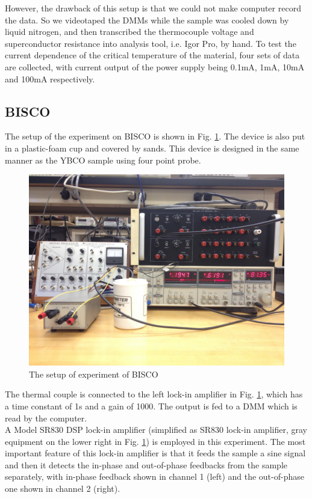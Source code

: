 \documentclass[prb,preprint]{revtex4-1}
\begin{document}
However, the drawback of this setup is that we could not make computer record the data. So we videotaped the DMMs while the sample was cooled down by liquid nitrogen, and then transcribed the thermocouple voltage and superconductor resistance into analysis tool, i.e. Igor Pro, by hand. To test the current dependence of the critical temperature of the material, four sets of data are collected, with current output of the power supply being 0.1mA, 1mA, 10mA and 100mA respectively.\\

\subsection{BISCO}

The setup of the experiment on BISCO is shown in Fig. \ref{biscosetup}. The device is also put in a plastic-foam cup and covered by sands. This device is designed in the same manner as the YBCO sample using four point probe.

\begin{figure}[h]
\centering
\includegraphics[width=14cm]{biscosetup.jpg}
\caption{The setup of experiment of BISCO}
\label{biscosetup}
\end{figure}

The thermal couple is connected to the left lock-in amplifier in Fig. \ref{biscosetup}, which has a time constant of 1s and a gain of 1000. The output is fed to a DMM which is read by the computer. \\

A Model SR830 DSP lock-in amplifier (simplified as SR830 lock-in amplifier, gray equipment on the lower right in Fig. \ref{biscosetup}) is employed in this experiment. The most important feature of this lock-in amplifier is that it feeds the sample a sine signal and then it detects the in-phase and out-of-phase feedbacks from the sample separately, with in-phase feedback shown in channel 1 (left) and the out-of-phase one shown in channel 2 (right). \\
\end{document}
